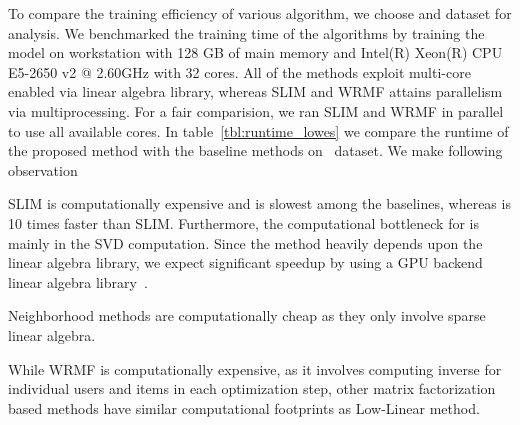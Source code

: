 
To compare the training efficiency of various algorithm, we choose \Lowes and \MLens dataset for analysis.
We benchmarked the training time of the algorithms 
by training the model on  workstation with 128 GB of main memory and Intel(R) Xeon(R) CPU E5-2650 v2 @ 2.60GHz with 32 cores. All of the methods exploit multi-core enabled via linear algebra library, whereas SLIM and WRMF attains parallelism via multiprocessing. For a fair comparision, we ran  SLIM and WRMF in parallel to use all available cores.  In table~\ref{tbl:runtime_lowes} we compare the runtime of the proposed method with the baseline methods on \Lowes\ dataset. We  make following observation
\begin{compactitem}
\item  SLIM is computationally expensive and is slowest among the baselines, whereas \LinearLow is 10 times faster than SLIM. Furthermore, the computational bottleneck for \LinearLow is mainly in the SVD computation. Since the method heavily depends upon the linear algebra library, we expect significant speedup by using a GPU backend linear algebra library~\citep{Voronin:GPURSVD}. 
\item Neighborhood methods are computationally cheap as they only involve sparse linear algebra.
\item While WRMF is computationally expensive, as it involves computing inverse for individual users and items in each optimization step, other matrix factorization based methods have similar computational footprints as Low-Linear method.
\end{compactitem}

\begin{table}
\caption{Training time on the  \Lowes  and \MLens Dataset.}
\label{tbl:runtime_lowes}
\centering
{}

\end{table}